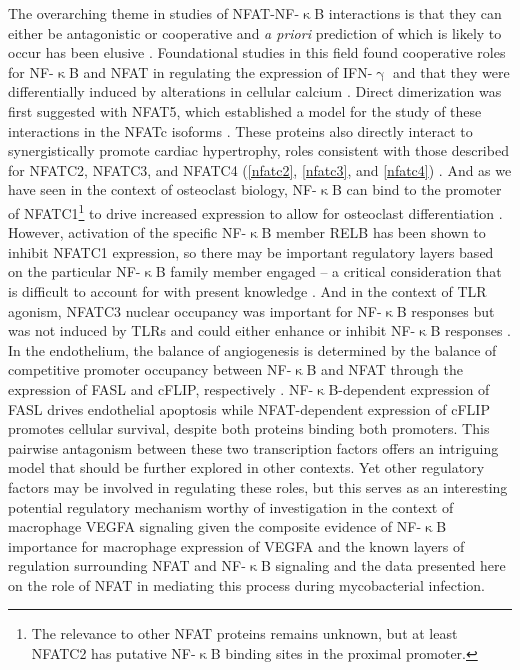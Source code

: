 The overarching theme in studies of NFAT\hyp{}NF\hyp{}$\upkappa$B interactions is that they can either be antagonistic or cooperative and \textit{a priori} prediction of which is likely to occur has been elusive \citep{Khalaf2013, Fisher2006}. Foundational studies in this field found cooperative roles for NF\hyp{}$\upkappa$B and NFAT in regulating the expression of IFN\hyp{}$\upgamma$ \citep{Sica1997} and that they were differentially induced by alterations in cellular calcium \citep{Dolmetsch1997}. Direct dimerization was first suggested with NFAT5, which established a model for the study of these interactions in the NFATc isoforms \citep{LopezRodriguez2001}. These proteins also directly interact to synergistically promote cardiac hypertrophy, roles consistent with those described for NFATC2, NFATC3, and NFATC4 (\autoref{nfatc2}, \autoref{nfatc3}, and \autoref{nfatc4}) \citep{Liu2012}. And as we have seen in the context of osteoclast biology, NF\hyp{}$\upkappa$B can bind to the promoter of NFATC1\footnote{The relevance to other NFAT proteins remains unknown, but at least NFATC2 has putative NF\hyp{}$\upkappa$B binding sites in the proximal promoter.} to drive increased expression to allow for osteoclast differentiation \citep{Asagiri2005}. However, activation of the specific NF\hyp{}$\upkappa$B member RELB has been shown to inhibit NFATC1 expression, so there may be important regulatory layers based on the particular NF\hyp{}$\upkappa$B family member engaged -- a critical consideration that is difficult to account for with present knowledge \citep{Zhao2015}. And in the context of TLR agonism, NFATC3 nuclear occupancy was important for NF\hyp{}$\upkappa$B responses but was not induced by TLRs and could either enhance or inhibit NF\hyp{}$\upkappa$B responses \citep{Minematsu2011, Conboy1999}. In the endothelium, the balance of angiogenesis is determined by the balance of competitive promoter occupancy between NF\hyp{}$\upkappa$B and NFAT through the expression of FASL and cFLIP, respectively \citep{Aurora2010}. NF\hyp{}$\upkappa$B\hyp{}dependent expression of FASL drives endothelial apoptosis while NFAT\hyp{}dependent expression of cFLIP promotes cellular survival, despite both proteins binding both promoters. This pairwise antagonism between these two transcription factors offers an intriguing model that should be further explored in other contexts. Yet other regulatory factors may be involved in regulating these roles, but this serves as an interesting potential regulatory mechanism worthy of investigation in the context of macrophage VEGFA signaling given the composite evidence of NF\hyp{}$\upkappa$B importance for macrophage expression of VEGFA and the known layers of regulation surrounding NFAT and NF\hyp{}$\upkappa$B signaling and the data presented here on the role of NFAT in mediating this process during mycobacterial infection.

